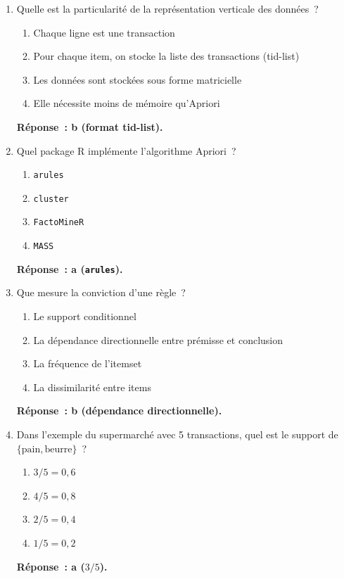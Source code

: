 \documentclass[a4paper,11pt]{article}
\theoremstyle{definition}
\theoremstyle{remark}
\begin{document}
\begin{enumerate}
  \item Quelle est la particularit\'e de la repr\'esentation
    verticale des donn\'ees~?
    \begin{enumerate}
      \item Chaque ligne est une transaction
      \item Pour chaque item, on stocke la liste des transactions
        (tid-list)
      \item Les donn\'ees sont stock\'ees sous forme matricielle
      \item Elle n\'ecessite moins de m\'emoire qu'Apriori
    \end{enumerate}
    \textbf{R\'eponse~: b (format tid-list).}

  \item Quel package R impl\'emente l'algorithme Apriori~?
    \begin{enumerate}
      \item \texttt{arules}
      \item \texttt{cluster}
      \item \texttt{FactoMineR}
      \item \texttt{MASS}
    \end{enumerate}
    \textbf{R\'eponse~: a (\texttt{arules}).}

  \item Que mesure la conviction d'une r\`egle~?
    \begin{enumerate}
      \item Le support conditionnel
      \item La d\'ependance directionnelle entre pr\'emisse et
        conclusion
      \item La fr\'equence de l'itemset
      \item La dissimilarit\'e entre items
    \end{enumerate}
    \textbf{R\'eponse~: b (d\'ependance directionnelle).}

  \item Dans l'exemple du supermarch\'e avec 5 transactions,
    quel est le support de $\{\text{pain}, \text{beurre}\}$~?
    \begin{enumerate}
      \item $3/5 = 0{,}6$
      \item $4/5 = 0{,}8$
      \item $2/5 = 0{,}4$
      \item $1/5 = 0{,}2$
    \end{enumerate}
    \textbf{R\'eponse~: a ($3/5$).}


\end{enumerate}
\end{document}
